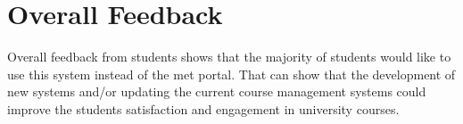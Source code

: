 \section{Overall Feedback}
\label{sec:overall-feedback}
Overall feedback from students shows that the majority of students would like to use this system instead of the \ac{met} portal. That
can show that the development of new systems and/or updating the current course management systems could improve the students satisfaction and
engagement in university courses.

